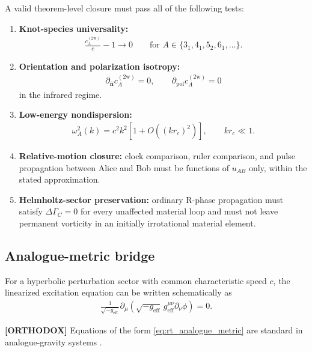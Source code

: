A valid theorem-level closure must pass all of the following tests:
\begin{enumerate}
    \item \textbf{Knot-species universality:}
    \begin{align}
        \frac{c_A^{(2\mathrm w)}}{c}-1
        \longrightarrow 0
        \qquad
        \text{for }A\in\{3_1,4_1,5_2,6_1,\ldots\}.
    \end{align}
    \item \textbf{Orientation and polarization isotropy:}
    \begin{align}
        \partial_{\hat{\mathbf n}}c_A^{(2\mathrm w)}=0,
        \qquad
        \partial_{\mathrm{pol}}c_A^{(2\mathrm w)}=0
    \end{align}
    in the infrared regime.
    \item \textbf{Low-energy nondispersion:}
    \begin{align}
        \omega_A^2(k)
        =
        c^2k^2
        \left[1+O\!\left((kr_c)^2\right)\right],
        \qquad
        kr_c\ll1 .
        \label{eq:rt_torsion_ir_dispersion_target}
    \end{align}
    \item \textbf{Relative-motion closure:} clock comparison, ruler comparison,
    and pulse propagation between Alice and Bob must be functions of \(u_{AB}\)
    only, within the stated approximation.
    \item \textbf{Helmholtz-sector preservation:} ordinary R-phase propagation
    must satisfy \(\Delta\Gamma_C=0\) for every unaffected material loop and
    must not leave permanent vorticity in an initially irrotational material
    element.
\end{enumerate}

\subsection{Analogue-metric bridge}

For a hyperbolic perturbation sector with common characteristic speed \(c\),
the linearized excitation equation can be written schematically as
\begin{align}
    \frac{1}{\sqrt{-g_{\mathrm{eff}}}}
    \partial_\mu
    \left(
        \sqrt{-g_{\mathrm{eff}}}\,
        g_{\mathrm{eff}}^{\mu\nu}
        \partial_\nu \phi
    \right)
    =
    0 .
    \label{eq:rt_analogue_metric}
\end{align}

\textbf{[ORTHODOX]} Equations of the form
\eqref{eq:rt_analogue_metric} are standard in analogue-gravity systems
\cite{Unruh1981,BarceloLiberatiVisser2011,BarceloLiberatiVisser2026}.

